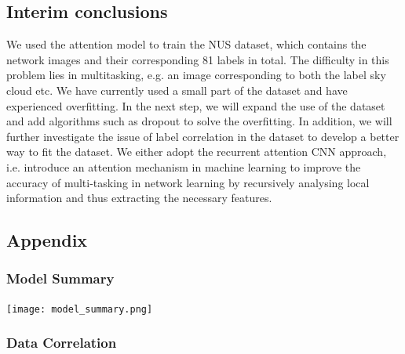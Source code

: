 \documentclass{article}
\begin{document}
\subsection{Interim conclusions}
We used the attention model to train the NUS dataset, which contains the network images and their corresponding 81 labels in total. The difficulty in this problem lies in multitasking, e.g. an image corresponding to both the label sky cloud etc. We have currently used a small part of the dataset and have experienced overfitting. In the next step, we will expand the use of the dataset and add algorithms such as dropout to solve the overfitting. In addition, we will further investigate the issue of label correlation in the dataset to develop a better way to fit the dataset.
We either adopt the recurrent attention CNN approach, i.e. introduce an attention mechanism in machine learning to improve the accuracy of multi-tasking in network learning by recursively analysing local information and thus extracting the necessary features.
\subsection{Appendix}
\subsubsection{Model Summary}
\texttt{[image: model\_summary.png]}
\subsubsection{Data Correlation}
\end{document}
